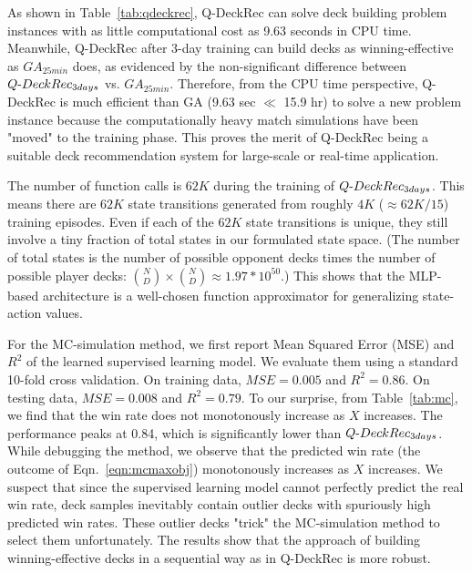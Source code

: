 
As shown in Table~\ref{tab:qdeckrec}, Q-DeckRec can solve deck building problem instances with as little computational cost as 9.63 seconds in CPU time. Meanwhile, Q-DeckRec after 3-day training can build decks as winning-effective as $GA_{25min}$ does, as evidenced by the non-significant difference between $Q\textnormal{-}DeckRec_{ 3days}$ vs. $GA_{25min}$. Therefore, from the CPU time perspective, Q-DeckRec is much efficient than GA ({9.63 sec $\ll$ 15.9 hr}) to solve a new problem instance because the computationally heavy match simulations have been "moved" to the training phase. This proves the merit of Q-DeckRec being a suitable deck recommendation system for large-scale or real-time application. 

The number of function calls is $62K$ during the training of $Q\textnormal{-}DeckRec_{3days}$. This means there are $62K$ state transitions generated from roughly $4K$ ($\approx 62K/15$) training episodes. Even if each of the $62K$ state transitions is unique, they still involve a tiny fraction of total states in our formulated state space. (The number of total states is the number of possible opponent decks times the number of possible player decks: ${N\choose D} \times {N\choose D} \approx 1.97 * 10^{50}$.) This shows that the MLP-based architecture is a well-chosen function approximator for generalizing state-action values.    


For the MC-simulation method, we first report Mean Squared Error (MSE) and $R^2$ of the learned supervised learning model. We evaluate them using a standard 10-fold cross validation. On training data, $MSE=0.005$ and $R^2=0.86$. On testing data, $MSE=0.008$ and $R^2=0.79$. To our surprise, from Table~\ref{tab:mc}, we find that the win rate does not monotonously increase as $X$ increases. The performance peaks at 0.84, which is significantly lower than $Q\textnormal{-}DeckRec_{3days}$. While debugging the method, we observe that the predicted win rate (the outcome of Eqn.~\ref{eqn:mcmaxobj}) monotonously increases as $X$ increases. We suspect that since the supervised learning model cannot perfectly predict the real win rate, deck samples inevitably contain outlier decks with spuriously high predicted win rates. These outlier decks "trick" the MC-simulation method to select them unfortunately. The results show that the approach of building winning-effective decks in a sequential way as in Q-DeckRec is more robust.





